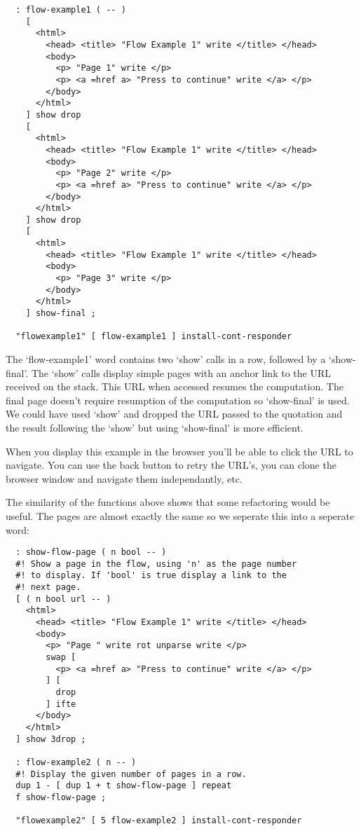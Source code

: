 \begin{verbatim}
  : flow-example1 ( -- )
    [
      <html>
        <head> <title> "Flow Example 1" write </title> </head>
        <body>
          <p> "Page 1" write </p>
          <p> <a =href a> "Press to continue" write </a> </p>
        </body>
      </html>   
    ] show drop 
    [
      <html>
        <head> <title> "Flow Example 1" write </title> </head>
        <body>
          <p> "Page 2" write </p>
          <p> <a =href a> "Press to continue" write </a> </p>
        </body>
      </html>   
    ] show drop 
    [
      <html>
        <head> <title> "Flow Example 1" write </title> </head>
        <body>
          <p> "Page 3" write </p>
        </body>
      </html>   
    ] show-final ;

  "flowexample1" [ flow-example1 ] install-cont-responder
\end{verbatim}

The `flow-example1' word contains two `show' calls in a row, followed
by a `show-final'. The `show' calls display simple pages with an anchor
link to the URL received on the stack. This URL when accessed resumes
the computation. The final page doesn't require resumption of the
computation so `show-final' is used. We could have used `show' and
dropped the URL passed to the quotation and the result following the
`show' but using `show-final' is more efficient.

When you display this example in the browser you'll be able to click
the URL to navigate. You can use the back button to retry the URL's,
you can clone the browser window and navigate them independantly, etc.

The similarity of the functions above shows that some refactoring
would be useful. The pages are almost exactly the same so we seperate
this into a seperate word:

\begin{verbatim}
  : show-flow-page ( n bool -- )
  #! Show a page in the flow, using 'n' as the page number
  #! to display. If 'bool' is true display a link to the 
  #! next page.
  [ ( n bool url -- )
    <html>
      <head> <title> "Flow Example 1" write </title> </head>
      <body>
        <p> "Page " write rot unparse write </p>
        swap [
          <p> <a =href a> "Press to continue" write </a> </p>
        ] [
          drop 
        ] ifte
      </body>
    </html>   
  ] show 3drop ;

  : flow-example2 ( n -- )
  #! Display the given number of pages in a row.
  dup 1 - [ dup 1 + t show-flow-page ] repeat
  f show-flow-page ;
 
  "flowexample2" [ 5 flow-example2 ] install-cont-responder
\end{verbatim}

